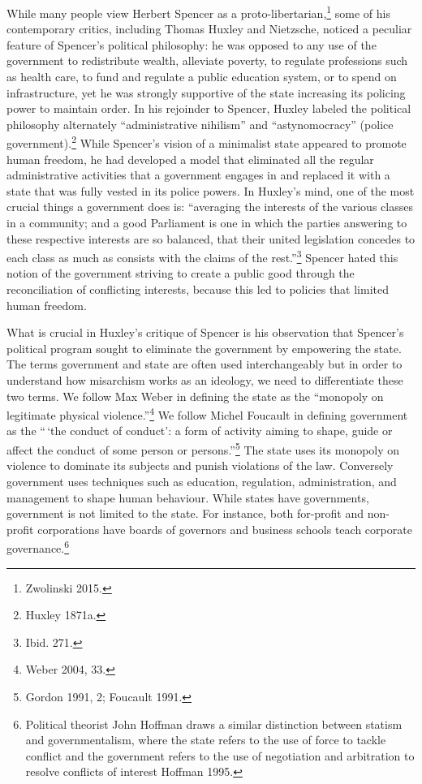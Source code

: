 \documentclass[12pt,]{article}
\begin{document}
While many people view Herbert Spencer as a proto-libertarian,\footnote{Zwolinski
  2015. } some of his contemporary critics, including Thomas Huxley and
Nietzsche, noticed a peculiar feature of Spencer's political philosophy:
he was opposed to any use of the government to redistribute wealth,
alleviate poverty, to regulate professions such as health care, to fund
and regulate a public education system, or to spend on infrastructure,
yet he was strongly supportive of the state increasing its policing
power to maintain order. In his rejoinder to Spencer, Huxley labeled the
political philosophy alternately ``administrative nihilism'' and
``astynomocracy'' (police government).\footnote{Huxley 1871a. } While
Spencer's vision of a minimalist state appeared to promote human
freedom, he had developed a model that eliminated all the regular
administrative activities that a government engages in and replaced it
with a state that was fully vested in its police powers. In Huxley's
mind, one of the most crucial things a government does is: ``averaging
the interests of the various classes in a community; and a good
Parliament is one in which the parties answering to these respective
interests are so balanced, that their united legislation concedes to
each class as much as consists with the claims of the rest.''\footnote{Ibid.
  271. } Spencer hated this notion of the government striving to create
a public good through the reconciliation of conflicting interests,
because this led to policies that limited human freedom.

What is crucial in Huxley's critique of Spencer is his observation that
Spencer's political program sought to eliminate the government by
empowering the state. The terms government and state are often used
interchangeably but in order to understand how misarchism works as an
ideology, we need to differentiate these two terms. We follow Max Weber
in defining the state as the ``monopoly on legitimate physical
violence.''\footnote{Weber 2004, 33. } We follow Michel Foucault in
defining government as the ``\,`the conduct of conduct': a form of
activity aiming to shape, guide or affect the conduct of some person or
persons.''\footnote{Gordon 1991, 2; Foucault 1991. } The state uses its
monopoly on violence to dominate its subjects and punish violations of
the law. Conversely government uses techniques such as education,
regulation, administration, and management to shape human behaviour.
While states have governments, government is not limited to the state.
For instance, both for-profit and non-profit corporations have boards of
governors and business schools teach corporate governance.\footnote{Political
  theorist John Hoffman draws a similar distinction between statism and
  governmentalism, where the state refers to the use of force to tackle
  conflict and the government refers to the use of negotiation and
  arbitration to resolve conflicts of interest Hoffman 1995.}
\end{document}
